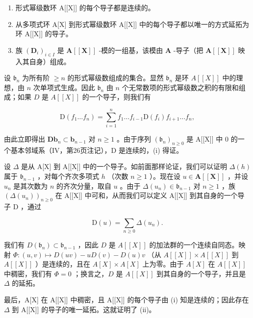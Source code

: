 \begin{enumerate}
\def\labelenumi{(\roman{enumi})}
\item
  形式幂级数环 A{[}{[}X{]}{]} 的每个导子都是连续的。
\item
  从多项式环 A{[}X{]} 到形式幂级数环 A{[}{[}X{]}{]} 中的每个导子都以唯一的方式延拓为环 A{[}{[}X{]}{]} 的导子。
\item
  族 \((\mathbf{D}_i)_{i\in I}\) 是 \(\mathbf{A}[[\mathbf{X}]]\) -模的一组基，该模由 \(\mathbf{A}\) -导子（把 \(\mathbf{A}[[\mathbf{X}]]\) 映入其自身）组成。
\end{enumerate}

设 \(\mathfrak{b}_n\) 为所有阶 \(\geqslant n\) 的形式幂级数组成的集合。显然 \(\mathfrak{b}_n\) 是环 \(A[[X]]\) 中的理想，由 \(n\) 次单项式生成。因此 \(\mathfrak{b}_n\) 由 \(n\) 个无常数项的形式幂级数之积的有限和组成；如果 \(D\) 是 \(A[[X]]\) 的一个导子，则我们有

\[
\mathrm{D} (f _ {1} \dots f _ {n}) = \sum_ {i = 1} ^ {n} f _ {1} \dots f _ {i - 1} \mathrm{D} (f _ {i}) f _ {i + 1} \dots f _ {n},
\]

由此立即得出 \(\mathbf{Db}_{n} \subset \mathbf{b}_{n-1}\) 对 \(n \geqslant 1\) 。由于序列 \((\mathfrak{b}_n)_{n \geqslant 0}\) 是 A{[}{[}X{]}{]} 中 0 的一个基本邻域系（IV，第26页注记），D 是连续的，(i) 得证。

设 \(\Delta\) 是从 A{[}X{]} 到 A{[}{[}X{]}{]} 中的一个导子。如前面那样论证，我们可以证明 \(\Delta(h)\) 属于 \(\mathfrak{b}_{n-1}\) ，对每个齐次多项式 \(h\) （次数 \(n \geqslant 1\) ）。现在设 \(u \in \mathbf{A}[[\mathbf{X}]]\) ，并设 \(u_n\) 是其次数为 \(n\) 的齐次分量，取自 \(u\) 。由于 \(\Delta(u_n) \in \mathfrak{b}_{n-1}\) 对 \(n \geqslant 1\) ，族 \((\Delta(u_n))_{n \geqslant 0}\) 在 A{[}{[}X{]}{]} 中可和，从而我们可以定义 A{[}{[}X{]}{]} 到其自身的一个导子 D ，通过

\[
\mathrm{D} (u) = \sum_ {n \geqslant 0} \Delta \left(u _ {n}\right).
\]

我们有 \(D(\mathfrak{b}_n) \subset \mathfrak{b}_{n-1}\) ，因此 \(D\) 是 \(A[[X]]\) 的加法群的一个连续自同态。映射 \(\Phi: (u, v) \mapsto D(uv) - uD(v) - D(u)v\) （从 \(A[[X]] \times A[[X]]\) 到 \(A[[X]]\) ）是连续的，且在 \(A[X] \times A[X]\) 上为零。由于 \(A[X]\) 在 \(A[[X]]\) 中稠密，我们有 \(\Phi = 0\) ；换言之，\(D\) 是 \(A[[X]]\) 到其自身的一个导子，并且是 \(\Delta\) 的延拓。

最后，A{[}X{]} 在 A{[}{[}X{]}{]} 中稠密，且 A{[}{[}X{]}{]} 的每个导子由 (i) 知是连续的；因此存在 \(\Delta\) 到 A{[}{[}X{]}{]} 的导子的唯一延拓。这就证明了 (ii)。

